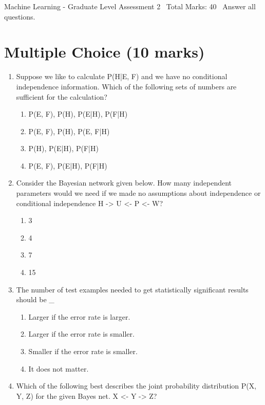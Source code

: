\documentclass[12pt]{article}
\begin{document}
\begin{center}
Machine Learning - Graduate Level Assessment 2 \
Total Marks: 40 \
Answer all questions.
\end{center}

\section*{Multiple Choice (10 marks)}
\begin{enumerate}[label=\arabic*.]
\item Suppose we like to calculate P(H|E, F) and we have no conditional independence information. Which of the following sets of numbers are sufficient for the calculation?
\begin{enumerate}[label=(\alph*)]
    \item P(E, F), P(H), P(E|H), P(F|H)
    \item P(E, F), P(H), P(E, F|H)
    \item P(H), P(E|H), P(F|H)
    \item P(E, F), P(E|H), P(F|H)
\end{enumerate}
\item Consider the Bayesian network given below. How many independent parameters would we need if we made no assumptions about independence or conditional independence H -\textgreater{} U \textless{}- P \textless{}- W?
\begin{enumerate}[label=(\alph*)]
    \item 3
    \item 4
    \item 7
    \item 15
\end{enumerate}
\item The number of test examples needed to get statistically significant results should be \_
\begin{enumerate}[label=(\alph*)]
    \item Larger if the error rate is larger.
    \item Larger if the error rate is smaller.
    \item Smaller if the error rate is smaller.
    \item It does not matter.
\end{enumerate}
\item Which of the following best describes the joint probability distribution P(X, Y, Z) for the given Bayes net. X \textless{}- Y -\textgreater{} Z?
\begin{enumerate}[label=(\alph*)]

\end{enumerate}
\end{enumerate}
\end{document}
